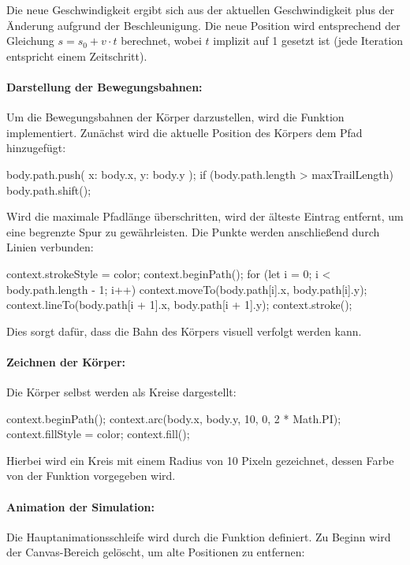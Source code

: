 \documentclass[a4paper,12pt,twoside]{article}
\begin{document}
Die neue Geschwindigkeit ergibt sich aus der aktuellen Geschwindigkeit plus der Änderung aufgrund der Beschleunigung. Die neue Position wird entsprechend der Gleichung \( s = s_0 + v \cdot t \) berechnet, wobei \( t \) implizit auf 1 gesetzt ist (jede Iteration entspricht einem Zeitschritt).

\paragraph{Darstellung der Bewegungsbahnen:}
Um die Bewegungsbahnen der Körper darzustellen, wird die Funktion  implementiert. Zunächst wird die aktuelle Position des Körpers dem Pfad hinzugefügt:

\begin{javascript}
body.path.push({ x: body.x, y: body.y });
if (body.path.length > maxTrailLength) body.path.shift();
\end{javascript}

Wird die maximale Pfadlänge überschritten, wird der älteste Eintrag entfernt, um eine begrenzte Spur zu gewährleisten. Die Punkte werden anschließend durch Linien verbunden:

\begin{javascript}
context.strokeStyle = color;
context.beginPath();
for (let i = 0; i < body.path.length - 1; i++) {
    context.moveTo(body.path[i].x, body.path[i].y);
    context.lineTo(body.path[i + 1].x, body.path[i + 1].y);
}
context.stroke();
\end{javascript}

Dies sorgt dafür, dass die Bahn des Körpers visuell verfolgt werden kann.

\paragraph{Zeichnen der Körper:}
Die Körper selbst werden als Kreise dargestellt:

\begin{javascript}
context.beginPath();
context.arc(body.x, body.y, 10, 0, 2 * Math.PI);
context.fillStyle = color;
context.fill();
\end{javascript}

Hierbei wird ein Kreis mit einem Radius von 10 Pixeln gezeichnet, dessen Farbe von der Funktion vorgegeben wird.

\paragraph{Animation der Simulation:}
Die Hauptanimationsschleife wird durch die Funktion  definiert. Zu Beginn wird der Canvas-Bereich gelöscht, um alte Positionen zu entfernen:
\end{document}
